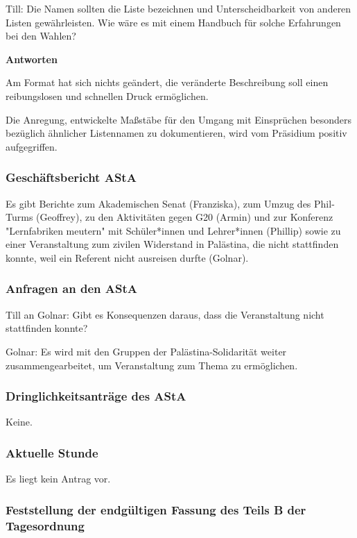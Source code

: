 \documentclass[ngerman,headheight=70pt]{scrartcl}
\begin{document}
    Till: Die Namen sollten die Liste bezeichnen und Unterscheidbarkeit von
    anderen Listen gewährleisten. Wie wäre es mit einem Handbuch für solche
    Erfahrungen bei den Wahlen?

    \textbf{Antworten}

    Am Format hat sich nichts geändert, die veränderte Beschreibung soll einen
    reibungslosen und schnellen Druck ermöglichen.

    Die Anregung, entwickelte Maßstäbe für den Umgang mit Einsprüchen besonders
    bezüglich ähnlicher Listennamen zu dokumentieren, wird vom Präsidium positiv
    aufgegriffen.

    \subsubsection{Geschäftsbericht AStA}

    Es gibt Berichte zum Akademischen Senat (Franziska), zum Umzug des Phil-Turms
    (Geoffrey), zu den Aktivitäten gegen G20 (Armin) und zur Konferenz
    "Lernfabriken meutern" mit Schüler*innen und Lehrer*innen (Phillip) sowie
    zu einer Veranstaltung zum zivilen Widerstand in Palästina, die nicht
    stattfinden konnte, weil ein Referent nicht ausreisen durfte (Golnar).

    \subsubsection{Anfragen an den AStA}

    Till an Golnar: Gibt es Konsequenzen daraus, dass die Veranstaltung nicht
    stattfinden konnte?

    Golnar: Es wird mit den Gruppen der Palästina-Solidarität weiter
    zusammengearbeitet, um Veranstaltung zum Thema zu ermöglichen.

    \subsubsection{Dringlichkeitsanträge des AStA}

    Keine.

    \subsubsection{Aktuelle Stunde}

    Es liegt kein Antrag vor.

    \subsubsection{Feststellung der endgültigen Fassung des Teils B der Tagesordnung}
\end{document}
